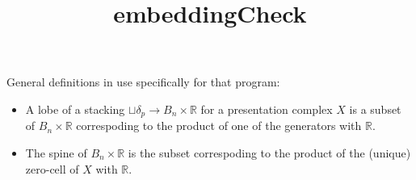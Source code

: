 \documentclass[12pt, letterpaper]{article}
\title{embeddingCheck}
\begin{document}
  General definitions in use specifically for that program:

    \begin{itemize}
        \item A lobe of a stacking $\sqcup \delta_p \to B_n \times \mathbb{R}$  for a presentation complex $X$ is a subset of $B_n \times \mathbb{R}$ correspoding to the product of one of the generators with $\mathbb{R}$.

        \item The spine of $B_n \times \mathbb{R}$ is the subset correspoding to the product of the (unique) zero-cell of $X$ with $\mathbb{R}$.
    \end{itemize} 
    
\end{document}
